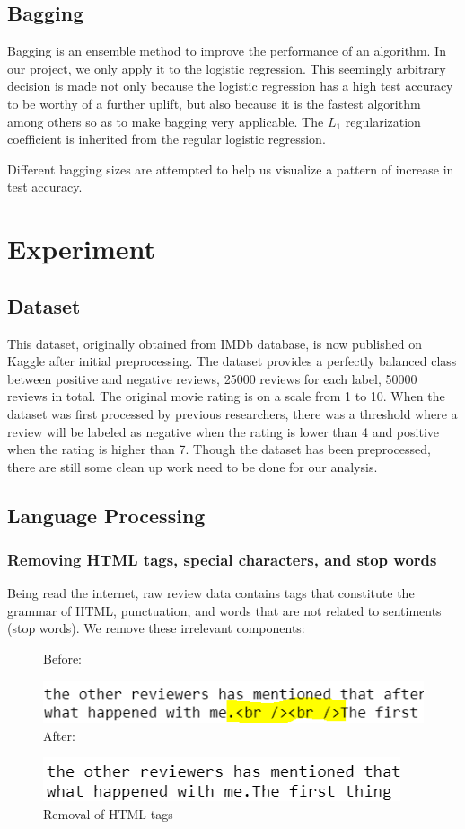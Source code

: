 \documentclass[10pt,twocolumn,letterpage]{article}
\begin{document}
	\subsection{Bagging}
	Bagging is an ensemble method to improve the performance of an algorithm. In our project, we only apply it to the logistic regression. This seemingly arbitrary decision is made not only because the logistic regression has a high test accuracy to be worthy of a further uplift, but also because it is the fastest algorithm among others so as to make bagging very applicable. The $L_1$ regularization coefficient is inherited from the regular logistic regression. 
	
	Different bagging sizes are attempted to help us visualize a pattern of increase in test accuracy. 
	\section{Experiment}	
	\subsection{Dataset}
	This dataset, originally obtained from IMDb database, is now published on Kaggle after initial preprocessing. The dataset provides a perfectly balanced class between positive and negative reviews, 25000 reviews for each label, 50000 reviews in total. The original movie rating is on a scale from 1 to 10. When the dataset was first processed by previous researchers, there was a threshold where a review will be labeled as negative when the rating is lower than 4 and positive when the rating is higher than 7. Though the dataset has been preprocessed, there are still some clean up work need to be done for our analysis.
	\subsection{Language Processing}
	\subsubsection{Removing HTML tags, special characters, and stop words}
	Being read the internet, raw review data contains tags that constitute the grammar of HTML, punctuation, and words that are not related to sentiments (stop words). We remove these irrelevant components: 
	
	\begin{figure}[H]
		\textsf{Before:}
		
		\includegraphics[width = \columnwidth]{html_tag}
		\textsf{After:}
		
		\includegraphics[width = \columnwidth]{html_tag_removed}
		\caption{Removal of HTML tags}
	\end{figure}
	
\end{document}
